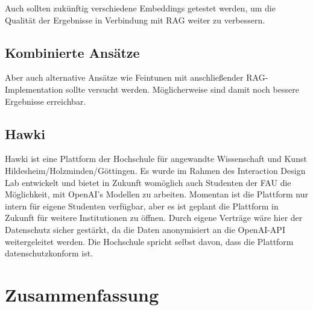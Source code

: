 \documentclass[german,report]{i1thesis}
\begin{document}
Auch sollten zukünftig verschiedene Embeddings getestet werden, um die Qualität der Ergebnisse in Verbindung mit \ac{RAG} weiter zu verbessern.

\subsection{Kombinierte Ansätze}

Aber auch alternative Ansätze wie Feintunen mit anschließender \ac{RAG}-Implementation sollte versucht werden.
Möglicherweise sind damit noch bessere Ergebnisse erreichbar.


\subsection{Hawki}%
\label{subsec:hawki}

Hawki \autocite{hawki} ist eine Plattform der Hochschule für angewandte Wissenschaft und Kunst Hildesheim/Holzminden/Göttingen.
Es wurde im Rahmen des Interaction Design Lab entwickelt und bietet in Zukunft womöglich auch Studenten der \ac{FAU} die Möglichkeit, mit OpenAI's Modellen zu arbeiten.
Momentan ist die Plattform nur intern für eigene Studenten verfügbar, aber es ist geplant die Plattform in Zukunft für weitere Institutionen zu öffnen.
Durch eigene Verträge wäre hier der Datenschutz sicher gestärkt, da die Daten anonymisiert an die OpenAI-\ac{API} weitergeleitet werden.
Die Hochschule spricht selbst davon, dass die Plattform datenschutzkonform ist.
 \autocite{hawk-datenschutz}


\section{Zusammenfassung}%
\label{sec:zusammenfassung}
\end{document}

